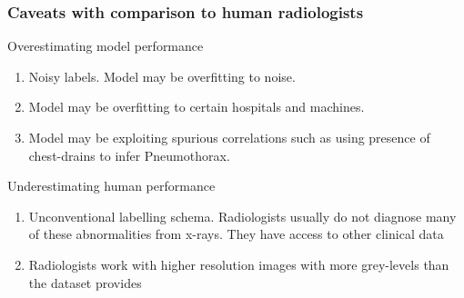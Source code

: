 \documentclass[8pt]{beamer}
\begin{document}
\begin{frame}
  \frametitle{Caveats with comparison to human radiologists}

  Overestimating model performance
  \begin{enumerate}
  \item{Noisy labels. Model may be overfitting to noise.}
  \item{Model may be overfitting to certain hospitals and machines.}
  \item{Model may be exploiting spurious correlations such as using presence of
      chest-drains to infer Pneumothorax.}
  \end{enumerate}
  \pause

  \vspace{\baselineskip}

  Underestimating human performance
  \begin{enumerate}
  \item{Unconventional labelling schema. Radiologists usually do not diagnose
      many of these abnormalities from x-rays. They have access to other
      clinical data}
  \item{Radiologists work with higher resolution images with more grey-levels
      than the dataset provides}
  \end{enumerate}
\end{frame}
\end{document}
